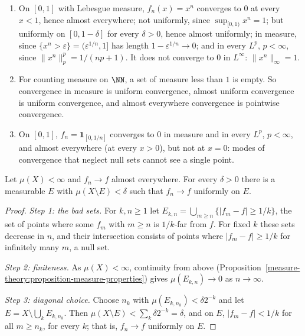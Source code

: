 \begin{example}\label{measure-theory:example-modes}
\begin{enumerate}
\item On $[0, 1]$ with Lebesgue measure, $f_n(x) = x^n$ converges to $0$ at every $x < 1$, hence almost everywhere; not uniformly, since $\sup_{[0, 1)}x^n = 1$; but uniformly on $[0, 1 - \delta]$ for every $\delta > 0$,
hence almost uniformly; in measure, since $\{x^n > \varepsilon\} = (\varepsilon^{1/n}, 1]$ has length $1 - \varepsilon^{1/n} \to 0$; and in every $L^p$, $p < \infty$, since $\|x^n\|_p^p = 1/(np + 1)$.
It does not converge to $0$ in $L^\infty$: $\|x^n\|_\infty = 1$.
\item For counting measure on $\NN$, a set of measure less than $1$ is empty. So convergence in measure is uniform convergence, almost uniform convergence is uniform convergence, and almost
everywhere convergence is pointwise convergence.
\item On $[0, 1]$, $f_n = \mathbf{1}_{[0, 1/n]}$ converges to $0$ in measure and in every $L^p$, $p < \infty$, and almost everywhere (at every $x > 0$), but not at $x = 0$: modes of convergence that
neglect null sets cannot see a single point.
\end{enumerate}
\end{example}

\begin{theorem}[Egorov]\label{measure-theory:theorem-egorov}
Let $\mu(X) < \infty$ and $f_n \to f$ almost everywhere. For every $\delta > 0$ there is a measurable $E$ with $\mu(X \setminus E) < \delta$ such that $f_n \to f$ uniformly on $E$.
\end{theorem}

\begin{proof}
\emph{Step 1: the bad sets.} For $k, n \geq 1$ let $E_{k,n} = \bigcup_{m \geq n}\{|f_m - f| \geq 1/k\}$, the set of points where some $f_m$ with $m \geq n$ is $1/k$-far from $f$. For fixed $k$ these sets
decrease in $n$, and their intersection consists of points where $|f_m - f| \geq 1/k$ for infinitely many $m$, a null set.

\emph{Step 2: finiteness.} As $\mu(X) < \infty$, continuity from above (Proposition~\ref{measure-theory:proposition-measure-properties}) gives $\mu(E_{k,n}) \to 0$ as $n \to \infty$.

\emph{Step 3: diagonal choice.} Choose $n_k$ with $\mu(E_{k,n_k}) < \delta2^{-k}$ and let $E = X \setminus \bigcup_kE_{k,n_k}$. Then $\mu(X \setminus E) < \sum_k\delta2^{-k} = \delta$, and on $E$,
$|f_m - f| < 1/k$ for all $m \geq n_k$, for every $k$; that is, $f_n \to f$ uniformly on $E$.
\end{proof}

